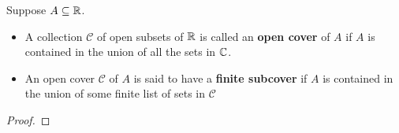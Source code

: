 \documentclass[11pt,a4paper]{book}
\begin{document}
\begin{definition}
    Suppose \( A \subseteq \mathbb{R}  \).
    \begin{itemize}
        \item A collection \( \mathcal{C} \) of open subsets of \( \mathbb{R}  \) is called an \textbf{open cover} of \( A  \) if \( A  \) is contained in the union of all the sets in \( \mathbb{C}  \).
        \item An open cover \( \mathcal{C}  \) of \( A  \) is said to have a \textbf{finite subcover} if \( A  \) is contained in the union of some finite list of sets in \( \mathcal{C}  \)
    \end{itemize}
\end{definition}
\begin{proof}

\end{proof}
\end{document}
